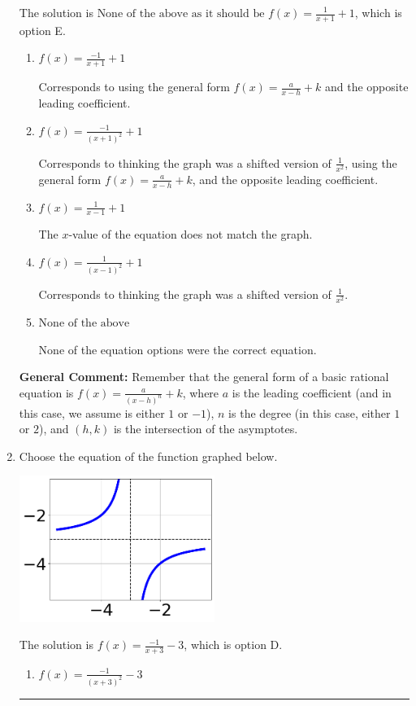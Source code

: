 \documentclass{extbook}[14pt]
\newcommand{\litem}[1]{\item #1

\rule{\textwidth}{0.4pt}}
\begin{document}
\begin{enumerate}
{The solution is \( \text{None of the above as it should be } f(x) = \frac{1}{x + 1} + 1 \), which is option E.\begin{enumerate}[label=\Alph*.]
\item \( f(x) = \frac{-1}{x + 1} + 1 \)

Corresponds to using the general form $f(x) = \frac{a}{x-h}+k$ and the opposite leading coefficient.
\item \( f(x) = \frac{-1}{(x + 1)^2} + 1 \)

Corresponds to thinking the graph was a shifted version of $\frac{1}{x^2}$, using the general form $f(x) = \frac{a}{x-h}+k$, and the opposite leading coefficient.
\item \( f(x) = \frac{1}{x - 1} + 1 \)

The $x$-value of the equation does not match the graph.
\item \( f(x) = \frac{1}{(x - 1)^2} + 1 \)

Corresponds to thinking the graph was a shifted version of $\frac{1}{x^2}$.
\item \( \text{None of the above} \)

None of the equation options were the correct equation.
\end{enumerate}

\textbf{General Comment:} Remember that the general form of a basic rational equation is $ f(x) = \frac{a}{(x-h)^n} + k$, where $a$ is the leading coefficient (and in this case, we assume is either $1$ or $-1$), $n$ is the degree (in this case, either $1$ or $2$), and $(h, k)$ is the intersection of the asymptotes.
}
\litem{
Choose the equation of the function graphed below.

\begin{center}
    \includegraphics[width=0.5\textwidth]{../Figures/rationalGraphToEquationC.png}
\end{center}




The solution is \( f(x) = \frac{-1}{x + 3} - 3 \), which is option D.\begin{enumerate}[label=\Alph*.]
\item \( f(x) = \frac{-1}{(x + 3)^2} - 3 \)


\end{enumerate}}
\end{enumerate}
\end{document}
